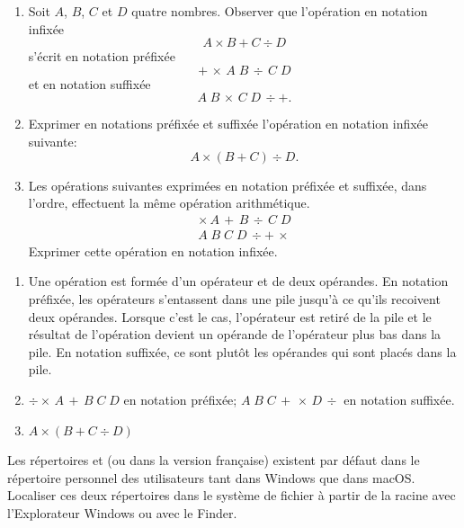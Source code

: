 \begin{exercice}
  \begin{enumerate}
  \item Soit $A$, $B$, $C$ et $D$ quatre nombres. Observer que
    l'opération en notation infixée
    \begin{equation*}
      A \times B + C \div D
    \end{equation*}
    s'écrit en notation préfixée
    \begin{equation*}
      +\, \times\, A\; B\, \div\, C\; D
    \end{equation*}
    et en notation suffixée
    \begin{equation*}
      A\; B\, \times\, C\; D\, \div +.
    \end{equation*}
  \item Exprimer en notations préfixée et suffixée l'opération en
    notation infixée suivante:
    \begin{equation*}
      A \times (B + C) \div D.
    \end{equation*}
  \item Les opérations suivantes exprimées en notation préfixée et
    suffixée, dans l'ordre, effectuent la même opération arithmétique.
    \begin{gather*}
      \times\, A\, +\, B\, \div\, C\; D \\
      A\; B\; C\; D\, \div +\, \times
    \end{gather*}
    Exprimer cette opération en notation infixée.
  \end{enumerate}
  \begin{sol}
    \begin{enumerate}
    \item Une opération est formée d'un opérateur et de deux
      opérandes. En notation préfixée, les opérateurs s'entassent dans
      une pile jusqu'à ce qu'ils recoivent deux opérandes. Lorsque
      c'est le cas, l'opérateur est retiré de la pile et le résultat
      de l'opération devient un opérande de l'opérateur plus bas dans
      la pile. En notation suffixée, ce sont plutôt les opérandes qui
      sont placés dans la pile.
    \item $\div \times\, A\, +\, B\; C\; D$ en notation préfixée;
      $A\; B\; C\, +\, \times\, D\, \div$ en notation suffixée.
    \item $A \times (B + C \div D)$
    \end{enumerate}
  \end{sol}
\end{exercice}

\begin{exercice}[nosol]
  Les répertoires  et  (ou 
  dans la version française) existent par défaut dans le %
  répertoire
  personnel des utilisateurs tant dans Windows que dans
  macOS. Localiser ces deux répertoires dans le système
  de fichier à partir de la racine avec %
  l'Explorateur Windows ou avec le
  Finder.
\end{exercice}

